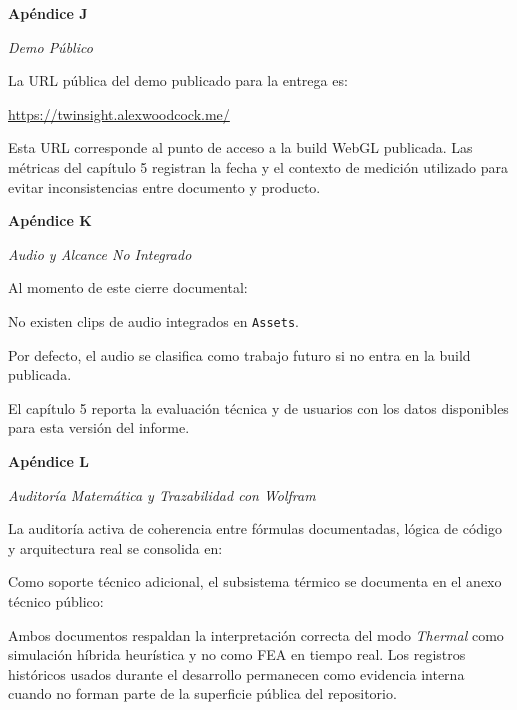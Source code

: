 \clearpage
{}
\label{apendice:J}
{\noindent\textbf{Apéndice J}\par
\noindent\textit{Demo Público}\par}

La URL pública del demo publicado para la entrega es:
\begin{center}
\url{https://twinsight.alexwoodcock.me/}
\end{center}

Esta URL corresponde al punto de acceso a la build WebGL publicada. Las métricas del capítulo 5 registran la fecha y el contexto de medición utilizado para evitar inconsistencias entre documento y producto.

\clearpage
{}
\label{apendice:K}
{\noindent\textbf{Apéndice K}\par
\noindent\textit{Audio y Alcance No Integrado}\par}

Al momento de este cierre documental:

No existen clips de audio integrados en \texttt{Assets}.

Por defecto, el audio se clasifica como trabajo futuro si no entra en la build publicada.

El capítulo 5 reporta la evaluación técnica y de usuarios con los datos disponibles para esta versión del informe.

\clearpage
{}
\label{apendice:L}
{\noindent\textbf{Apéndice L}\par
\noindent\textit{Auditoría Matemática y Trazabilidad con Wolfram}\par}

La auditoría activa de coherencia entre fórmulas documentadas, lógica de código y arquitectura real se consolida en:
\begin{center}
\end{center}

Como soporte técnico adicional, el subsistema térmico se documenta en el anexo técnico público:
\begin{center}
\end{center}

Ambos documentos respaldan la interpretación correcta del modo \textit{Thermal} como simulación híbrida heurística y no como FEA en tiempo real. Los registros históricos usados durante el desarrollo permanecen como evidencia interna cuando no forman parte de la superficie pública del repositorio.

